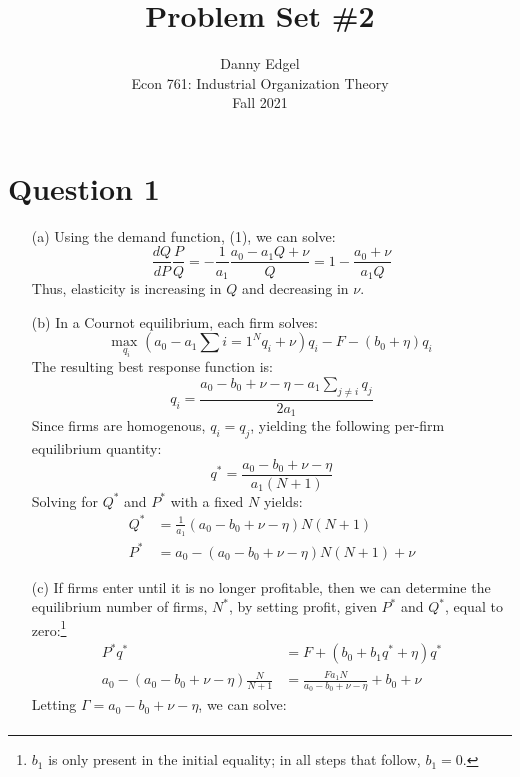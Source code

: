 \documentclass{article}
\newcommand{\usmax}[1]{\underset{#1}{\text{max }}}
\begin{document}
\title{	Problem Set \#2 }
\author{ 	Danny Edgel 					        	      \\ 
			Econ 761: Industrial Organization Theory	\\
			Fall 2021						                      \\
		}
\maketitle\thispagestyle{empty}



\section*{Question 1}
\begin{itemize}
    \item[(a)] Using the demand function, (1), we can solve: \[
    \frac{dQ}{dP}\frac{P}{Q} = -\frac{1}{a_1}\frac{a_0 - a_1Q + \nu}{Q} = 1 - \frac{a_0 + \nu}{a_1Q}
    \] 
    Thus, elasticity is increasing in $Q$ and decreasing in $\nu$.
    \item[(b)] In a Cournot equilibrium, each firm solves:\[
      \usmax{q_i}\left(a_0 - a_1\sum{i=1}^Nq_i + \nu\right)q_i - F - (b_0+\eta)q_i
    \]
    The resulting best response function is:\[
      q_i = \frac{a_0-b_0+\nu-\eta-a_1\sum_{j\neq i}q_j}{2a_1}
    \]
    Since firms are homogenous, $q_i=q_j$, yielding the following per-firm equilibrium quantity:\[
      q^* = \frac{a_0-b_0+\nu-\eta}{a_1(N+1)}
    \]
    Solving for $Q^*$ and $P^*$ with a fixed $N$ yields:\begin{align*}
      Q^* &= \frac{1}{a_1}\left(a_0-b_0+\nu-\eta\right)N(N+1) \\ 
      P^* &= a_0 - \left(a_0-b_0+\nu-\eta\right)N(N+1) + \nu
    \end{align*}
    \item[(c)] If firms enter until it is no longer profitable, then we can determine the equilibrium number of firms, $N^*$, by setting profit, given $P^*$ and $Q^*$, equal to zero:\footnote{$b_1$ is only present in the initial equality; in all steps that follow, ${b_1=0}$.} \begin{align*} 
      P^*q^*&= F  + (b_0 + b_1q^* + \eta)q^* \\
      a_0-(a_0-b_0+\nu-\eta)\frac{N}{N+1} &= \frac{Fa_1N}{a_0-b_0 + \nu - \eta}+b_0+\nu
    \end{align*}
    Letting ${\Gamma=a_0-b_0 + \nu - \eta}$, we can solve:\begin{align*}

\end{align*}
\end{itemize}
\end{document}
